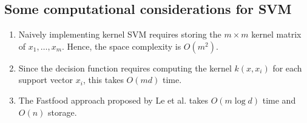 \documentclass[11pt]{article}
\begin{document}
\subsection{Some computational considerations for SVM}
\begin{enumerate}
\item Naively implementing kernel SVM requires storing the $m \times m$ kernel
matrix of $x_1,\dots,x_m$. Hence, the space complexity is $O(m^2)$.
\item Since the decision function requires computing the kernel $k(x,x_i)$ for
each support vector $x_i$, this takes $O(md)$ time.
\item The Fastfood approach proposed by Le et al. takes $O(m \log d)$ time and
$O(n)$ storage.
\end{enumerate}
\end{document}
